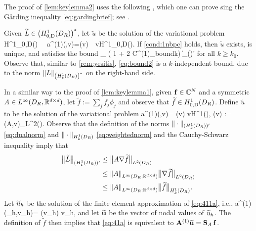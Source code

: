The proof of \cref{lem:keylemma2} uses the following , which one can prove sing the G\aa rding inequality \cref{eq:gardingbrief}; see \cite[Lemma 5.1]{GrPeSp:19}.

\label{lem:H1}
Given $\widetilde{\LE}\in \HozDDRs$, let $\widetilde{u}$ be the solution of the variational problem
\beqs
{} \,\, \in H^1_{0,D}(\DR) \,\,\tst \,\,
a^{(1)}(,v)=\widetilde{\LE}(v) \,\, \tfa v\in H^1_{0,D}(\DR).
\eeqs
If \cref{cond:1nbpc} holds, then $\widetilde{u}$ exists, is unique, and satisfies the bound
\beq\label{eq:bound2}
_{\HokDR} \leq {}\left( 1 + 2 C^{(1)}_{\rm bound}\nsomax  k\right) \big\|\widetilde{\LE}\big\|_{(\HokDR)'}
\eeq
for all $k\geq k_0$.
\ele
Observe that, similar to \cref{rem:yesitis}, \cref{eq:bound2} is a $k$-independent bound, due to the norm $\NHokDRs{\LE}$ on the right-hand side.


In a similar way to the proof of \cref{lem:keylemma1}, given $\mathbf{f} \in \mathbb C^N$ and a symmetric $A\in L^\infty(D_{R}, \mathbb R^{d\times d})$, let $\widetilde{f} := \sum_j f_j \phi_j$ and observe that $\widetilde{f} \in \HozDDR$. Define $\widetilde{u}$ to be the solution of the variational problem 
\beq\label{eq:411a}
a^{(1)}(,v)= \widetilde{\LE}(v) \quad{} v\in H^1(\Omega),
\quad{} \quad
 \widetilde{\LE}(v) :=(A\nabla{},\nabla v)_{L^2(\Omega)}.
\eeq
Observe that the definition of the norms $\|\cdot\|_{(\HokDR)'}$ \cref{eq:dualnorm} and $\|\cdot\|_{\HokDR}$ \cref{eq:weightednorm} and the Cauchy-Schwarz inequality imply that
\begin{align}
\big\| \widetilde{\LE}\big\|_{(\HokDR)'}&\leq \big\|A\nabla \widetilde{f}\big\|_{\LtDR}\nonumber\\
&\leq \NLiDRRRdtd{A} \big\|\nabla \widetilde{f}\big\|_{\LtDR}\label{eq:Fbounda}\\
&\leq \NLiDRRRdtd{A} \big\| \widetilde{f}\big\|_{\HokDR}.\label{eq:Fbound}
\end{align}
Let $\widetilde{u}_h$ be the solution of the finite element approximation of \cref{eq:411a}, i.e.,
\beq\label{eq:41a}
a^{(1)}(\tu_h,v_h)= \widetilde{\LE}(v_h) \quad{} v_h\in \Vhp,
\eeq
and let $\widetilde{\mathbf{u}}$ be the vector of nodal values of $\widetilde{u}_h$. The definition of $\widetilde{f}$ then implies that \cref{eq:41a} is equivalent to $\mathbf{A}^{(1)} \widetilde{\mathbf{u}} = \mathbf{S}_A\,\mathbf{f}$. 

